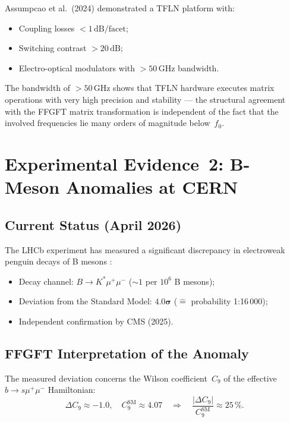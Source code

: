 Assumpcao et al.\ (2024) \cite{Assumpcao2024} demonstrated a TFLN
platform with:
\begin{itemize}
  \item Coupling losses $< 1\,\text{dB/facet}$;
  \item Switching contrast $> 20\,\text{dB}$;
  \item Electro-optical modulators with $> 50\,\text{GHz}$ bandwidth.
\end{itemize}
The bandwidth of $>50\,\text{GHz}$ shows that TFLN hardware executes
matrix operations with very high precision and stability — the structural
agreement with the FFGFT matrix transformation is independent of the
fact that the involved frequencies lie many orders of magnitude
below~$f_0$.

\section{Experimental Evidence~2: B-Meson Anomalies at CERN}

\subsection{Current Status (April 2026)}

The LHCb experiment has measured a significant discrepancy in
electroweak penguin decays of B mesons \cite{CERN2026a,CERN2026b}:

\begin{itemize}
  \item Decay channel: $B \to K^*\mu^+\mu^-$ ($\sim 1$ per $10^6$ B mesons);
  \item Deviation from the Standard Model: $\symbf{4.0\sigma}$
        ($\hat{=}$ probability 1:16\,000);
  \item Independent confirmation by CMS (2025).
\end{itemize}

\subsection{FFGFT Interpretation of the Anomaly}

The measured deviation concerns the Wilson coefficient~$C_9$ of the
effective $b \to s\mu^+\mu^-$ Hamiltonian:
\begin{equation}
  \Delta C_9 \approx -1.0, \quad
  C_9^{\text{SM}} \approx 4.07
  \quad\Rightarrow\quad
  \frac{|\Delta C_9|}{C_9^{\text{SM}}} \approx 25\,\%.
\end{equation}

